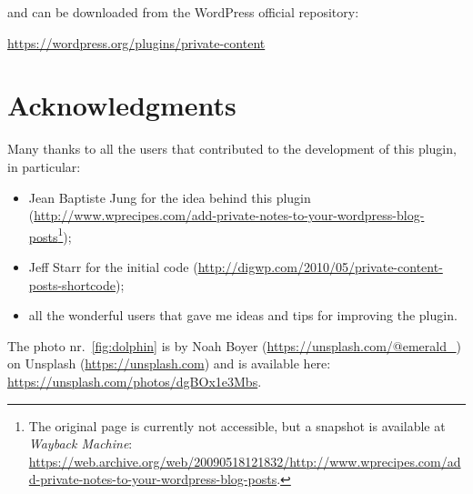 	\noindent and can be downloaded from the WordPress official repository:
	\begin{center}
	\url{https://wordpress.org/plugins/private-content}
	\end{center}

	\section*{Acknowledgments}

	Many thanks to all the users that contributed to the development of this
	plugin, in particular:

	\begin{itemize}
		\item Jean Baptiste Jung for the idea behind this plugin
		(\url{http://www.wprecipes.com/add-private-notes-to-your-wordpress-blog-posts}\footnote{The
		original page is currently not accessible, but a snapshot is available
		at \emph{Wayback Machine}:
		\url{https://web.archive.org/web/20090518121832/http://www.wprecipes.com/add-private-notes-to-your-wordpress-blog-posts}.});
		\item Jeff Starr for the initial code
		(\url{http://digwp.com/2010/05/private-content-posts-shortcode});
		\item all the wonderful users that gave me ideas and tips for improving
		the plugin.
	\end{itemize}

	\noindent The photo nr.~\vref{fig:dolphin} is by Noah Boyer
	(\url{https://unsplash.com/@emerald_}) on Unsplash
	(\url{https://unsplash.com}) and is available here:
	\url{https://unsplash.com/photos/dgBOx1e3Mbs}.

\endgroup